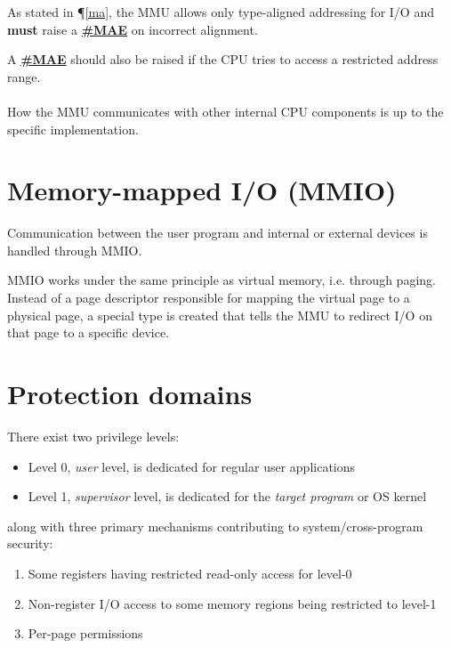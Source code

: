 \documentclass[a4paper,10pt]{article}
\begin{document}
As stated in \P\ref{ma}, the MMU allows only type-aligned addressing for I/O and \textbf{must} raise a \textbf{\hyperref[ir:MAE]{\#MAE}} on incorrect alignment.

A \textbf{\hyperref[ir:MAE]{\#MAE}} should also be raised if the CPU tries to access a restricted address range.\\
\\
How the MMU communicates with other internal CPU components is up to the specific implementation.

\section{Memory-mapped I/O (MMIO)}
Communication between the user program and internal or external devices is handled through \gls{MMIO}.

\gls{MMIO} works under the same principle as virtual memory, i.e. through paging. Instead of a page descriptor responsible for mapping the virtual page to a physical page, a special type is created that tells the MMU to redirect I/O on that page to a specific device.

\section{Protection domains}
There exist two privilege levels:
\begin{itemize}
	\item Level 0, \emph{user} level, is dedicated for regular user applications
	\item Level 1, \emph{supervisor} level, is dedicated for the \emph{target program} or OS kernel
\end{itemize}

along with three primary mechanisms contributing to system/cross-program security:
\begin{enumerate}
	\item Some registers having restricted read-only access for level-0
	\item Non-register I/O access to some memory regions being restricted to level-1
	\item Per-page permissions
\end{enumerate}
\end{document}
